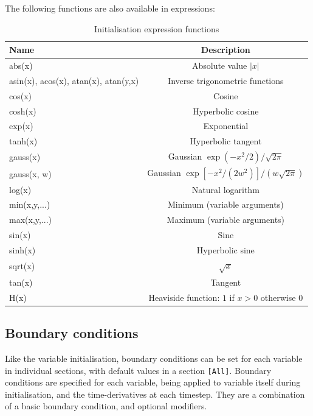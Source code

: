 \documentclass[12pt]{article}
\newcommand{\code}[1]{\texttt{#1}}
\begin{document}
The following functions are also available in expressions:
\begin{table}[htb!]
\centering
\caption{Initialisation expression functions}
\label{tab:initexprfunc}
\begin{tabular}{l | c }
\hline
Name & Description \\
\hline
abs(x) & Absolute value $\left|x\right|$\\
asin(x), acos(x), atan(x), atan(y,x) & Inverse trigonometric functions \\
cos(x) & Cosine\\
cosh(x) & Hyperbolic cosine\\
exp(x) & Exponential \\
tanh(x) & Hyperbolic tangent \\
gauss(x) & Gaussian $\exp\left(-x^2/2\right) / \sqrt{2\pi}$\\
gauss(x, w) & Gaussian $\exp\left[-x^2/\left(2w^2\right)\right] / \left(w\sqrt{2\pi}\right)$\\
log(x) & Natural logarithm \\
min(x,y,...) & Minimum (variable arguments) \\
max(x,y,...) & Maximum (variable arguments) \\
sin(x) & Sine\\
sinh(x) & Hyperbolic sine\\
sqrt(x) & $\sqrt{x}$\\
tan(x) & Tangent \\
H(x) & Heaviside function: $1$ if $x > 0$ otherwise $0$\\
\hline
\end{tabular}
\end{table}


\subsection{Boundary conditions}
\label{sec:bndryopts}
Like the variable initialisation, boundary conditions can be set for
each variable in individual sections, with default values in a section
\code{[All]}. Boundary conditions are specified for each variable, being 
applied to variable itself during initialisation, and the time-derivatives
at each timestep. They are a combination of a basic boundary condition, and
optional modifiers.
\end{document}
